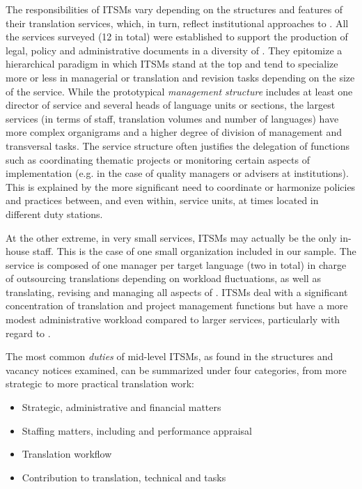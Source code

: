 \documentclass[output=paper]{langsci/langscibook}
\begin{document}
\largerpage
The responsibilities of ITSMs vary depending on the structures and features of their translation services, which, in turn, reflect institutional approaches to . All the services surveyed (12 in total) were established to support the production of legal, policy and administrative documents in a diversity of . They epitomize a hierarchical paradigm in which ITSMs stand at the top and tend to specialize more or less in managerial or translation and revision tasks depending on the size of the service. While the prototypical \textit{management structure} includes at least one director of service and several heads of language units or sections, the largest services (in terms of staff, translation volumes and number of languages) have more complex organigrams and a higher degree of division of management and transversal tasks. The service structure often justifies the delegation of functions such as coordinating thematic projects or monitoring certain aspects of  implementation (e.g. in the case of quality managers or advisers at  institutions). This is explained by the more significant need to coordinate or harmonize policies and practices between, and even within, service units, at times located in different duty stations. 



At the other extreme, in very small services, ITSMs may actually be the only in-house staff. This is the case of one small organization included in our sample. The service is composed of one manager per target language (two in total) in charge of outsourcing translations depending on workload fluctuations, as well as translating, revising and managing all aspects of . ITSMs deal with a significant concentration of translation and project management functions but have a more modest administrative workload compared to larger services, particularly with regard to .


\largerpage
The most common \textit{duties} of mid-level ITSMs, as found in the structures and vacancy notices examined, can be summarized under four categories, from more strategic to more practical translation work:


\begin{itemize}
\item 
Strategic, administrative and financial matters
\item 
Staffing matters, including  and performance appraisal
\item 
Translation workflow   
\item 
Contribution to translation, technical and  tasks
\end{itemize}
\end{document}
